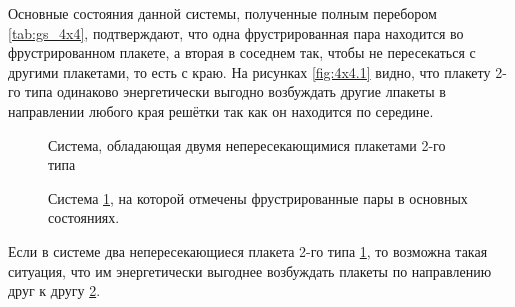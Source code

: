 \documentclass[utf8, babel, sor, jor, amsmath, amssymb, reprint]{elsarticle} %
\begin{document}
Основные состояния данной системы, полученные полным перебором \ref{tab:gs_4x4}, подтверждают, что одна фрустрированная пара находится во фрустрированном плакете, а вторая в соседнем так, чтобы не пересекаться с другими плакетами, то есть с краю. На рисунках \ref{fig:4x4.1} видно, что плакету 2-го типа одинаково энергетически выгодно возбуждать другие лпакеты в направлении любого края решётки так как он находится по середине.

\begin{figure}[H]
	\centering
	\caption{Система, обладающая двумя непересекающимися плакетами 2-го типа}
	\label{fig:4x7}
\end{figure}
\begin{figure}[H]
	\centering
	\caption{Система \ref{fig:4x7}, на которой отмечены фрустрированные пары  в основных состояниях.}
	\label{fig:4x7F}
\end{figure}

Если в системе два непересекающиеся плакета 2-го типа \ref{fig:4x7}, то возможна такая ситуация, что им энергетически выгоднее возбуждать плакеты по направлению друг к другу \ref{fig:4x7F}.
\end{document}
